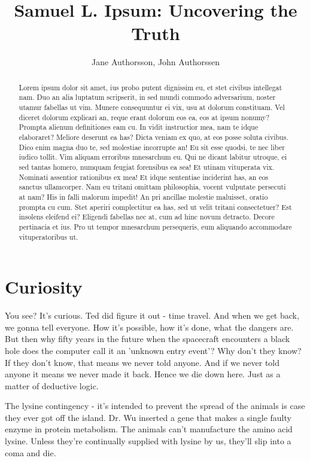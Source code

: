 \documentclass{cs19proc}
\title{Samuel L. Ipsum: Uncovering the Truth}
\author{Jane Authorsson, John Authorssen}
\begin{document}
\maketitle

\begin{abstract}
Lorem ipsum dolor sit amet, ius probo putent dignissim eu, et stet civibus intellegat nam. Duo an alia luptatum scripserit, in sed mundi commodo adversarium, noster utamur fabellas ut vim. Munere consequuntur ei vix, usu at dolorum constituam. Vel diceret dolorum explicari an, reque erant dolorum eos ea, eos at ipsum nonumy? Prompta alienum definitiones eam cu.
 In vidit instructior mea, nam te idque elaboraret? Meliore deserunt ea has? Dicta veniam ex quo, at eos posse soluta civibus. Dico enim magna duo te, sed molestiae incorrupte an! Eu sit esse quodsi, te nec liber iudico tollit. Vim aliquam erroribus mnesarchum eu.
 Qui ne dicant labitur utroque, ei sed tantas homero, numquam feugiat forensibus ea sea! Et utinam vituperata vix. Nominati assentior rationibus ex mea! Et idque sententiae inciderint has, an eos sanctus ullamcorper. Nam eu tritani omittam philosophia, vocent vulputate persecuti at nam? His in falli malorum impedit!
 An pri ancillae molestie maluisset, oratio prompta cu cum. Stet aperiri complectitur ea has, sed ut velit tritani consectetuer? Est insolens eleifend ei? Eligendi fabellas nec at, cum ad hinc novum detracto. Decore pertinacia et ius. Pro ut tempor mnesarchum persequeris, eum aliquando accommodare vituperatoribus ut.
\end{abstract}

\section{Curiosity}
You see? It's curious. Ted did figure it out - time travel. And when we get back, we gonna tell everyone. How it's possible, how it's done, what the dangers are. But then why fifty years in the future when the spacecraft encounters a black hole does the computer call it an 'unknown entry event'? Why don't they know? If they don't know, that means we never told anyone. And if we never told anyone it means we never made it back. Hence we die down here. Just as a matter of deductive logic.

The lysine contingency - it's intended to prevent the spread of the animals is case they ever got off the island. Dr. Wu inserted a gene that makes a single faulty enzyme in protein metabolism. The animals can't manufacture the amino acid lysine. Unless they're continually supplied with lysine by us, they'll slip into a coma and die.
\end{document}
